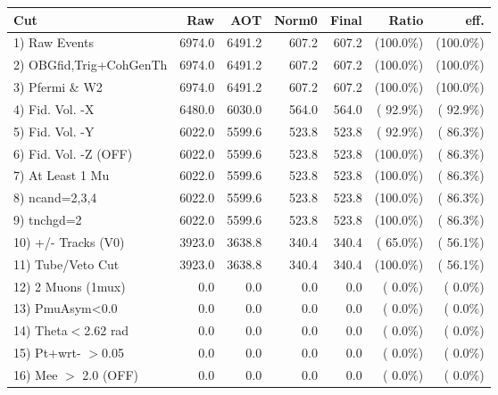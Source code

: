  \begin{table}[h!]\centering
 \begin{tabular}{||l||r|r|r|r|r|r||}
 \hline
 \hline
 Cut & Raw & AOT & Norm0 & Final & Ratio & eff.       \\
 \hline
  1) Raw Events           &       6974.0 &       6491.2 &        607.2 &        607.2 & (100.0\%) & (100.0\%) \\
  2) OBGfid,Trig+CohGenTh &       6974.0 &       6491.2 &        607.2 &        607.2 & (100.0\%) & (100.0\%) \\
  3) Pfermi \& W2         &       6974.0 &       6491.2 &        607.2 &        607.2 & (100.0\%) & (100.0\%) \\
  4) Fid. Vol. -X         &       6480.0 &       6030.0 &        564.0 &        564.0 & ( 92.9\%) & ( 92.9\%) \\
  5) Fid. Vol. -Y         &       6022.0 &       5599.6 &        523.8 &        523.8 & ( 92.9\%) & ( 86.3\%) \\
  6) Fid. Vol. -Z (OFF)   &       6022.0 &       5599.6 &        523.8 &        523.8 & (100.0\%) & ( 86.3\%) \\
  7) At Least 1 Mu        &       6022.0 &       5599.6 &        523.8 &        523.8 & (100.0\%) & ( 86.3\%) \\
  8) ncand=2,3,4          &       6022.0 &       5599.6 &        523.8 &        523.8 & (100.0\%) & ( 86.3\%) \\
  9) tnchgd=2             &       6022.0 &       5599.6 &        523.8 &        523.8 & (100.0\%) & ( 86.3\%) \\
 10) +/- Tracks (V0)      &       3923.0 &       3638.8 &        340.4 &        340.4 & ( 65.0\%) & ( 56.1\%) \\
 11) Tube/Veto Cut        &       3923.0 &       3638.8 &        340.4 &        340.4 & (100.0\%) & ( 56.1\%) \\
 12) 2 Muons (1mux)       &          0.0 &          0.0 &          0.0 &          0.0 & (  0.0\%) & (  0.0\%) \\
 13) PmuAsym<0.0          &          0.0 &          0.0 &          0.0 &          0.0 & (  0.0\%) & (  0.0\%) \\
 14) Theta$<$2.62 rad     &          0.0 &          0.0 &          0.0 &          0.0 & (  0.0\%) & (  0.0\%) \\
 15) Pt+wrt- $>$0.05      &          0.0 &          0.0 &          0.0 &          0.0 & (  0.0\%) & (  0.0\%) \\
 16) Mee $>$ 2.0  (OFF)   &          0.0 &          0.0 &          0.0 &          0.0 & (  0.0\%) & (  0.0\%) \\

\end{tabular}
\end{table}
